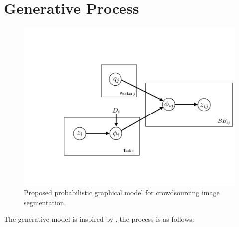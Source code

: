 \documentclass[12pt]{article}
\begin{document}
\section{Generative Process}
\begin{figure}[ht]
\centering
\includegraphics[trim=1cm 5cm 1cm 5cm,width=0.8\linewidth]{plots/generative_pgm.pdf}
\caption{Proposed probabilistic graphical model for crowdsourcing image segmentation.}
\end{figure}
The generative model is inspired by \cite{Welinder2010}, the process is as follows:
\end{document}
